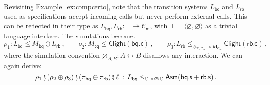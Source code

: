 \documentclass[acmsmall,screen,review,anonymous]{acmart}
\newcommand{\kw}[1]{\ensuremath{ \mathsf{#1} }}
\newcommand{\idsc}{\mathbf{id}} %
\newcommand{\vcomp}{\fatsemi}
\begin{document}



\begin{example} \label{ex:compcerto-sd} %
Revisiting Example~\ref{ex:compcerto},
note that the transition systems $L_\kw{bq}$ and $L_\kw{rb}$
used as specifications
accept incoming calls but never perform external calls.
This can be reflected in their type as
$L_\kw{bq}, L_\kw{rb} : \top \twoheadrightarrow \mathcal{C}_\kw{m}$,
with $\top = \langle \varnothing, \varnothing \rangle$
as a trivial language interface.
The simulations become:
\[
  \rho_1 :
  L_\kw{bq} \le M_\kw{bq} \odot L_\kw{rb}
  \,, \qquad
  \rho_2 :
  M_\kw{bq} \le \kw{Clight}(\kw{bq.c})
  \,, \qquad
  \rho_3 :
  L_\kw{rb} \le_{\varnothing_{\top,\mathcal{C}_\kw{m}}
    \twoheadrightarrow \idsc_{\mathcal{C}_\kw{m}} } \kw{Clight}(\kw{rb.c})
  \,,
\]
where the simulation convention
$\varnothing_{A,B} : A \leftrightarrow B$
disallows any interaction.
We can again derive:
\[
  \rho_1 \vcomp (\rho_2 \oplus \rho_3) \vcomp (\pi_\kw{bq} \oplus \pi_\kw{rb}) \vcomp \ell
  \::\:
  L_\kw{bq}
    \le_{\mathbb{C} \twoheadrightarrow \varnothing \vcomp \mathbb{C}}
    \kw{Asm}(\kw{bq.s} + \kw{rb.s})
  \,.
\]
\end{example}
\end{document}
